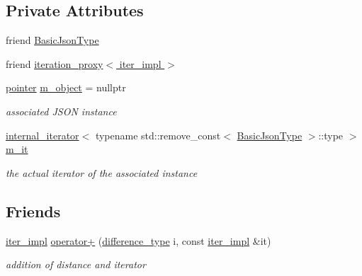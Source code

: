 \subsection*{Private Attributes}
\begin{DoxyCompactItemize}
\item 
friend \hyperlink{classnlohmann_1_1detail_1_1iter__impl_abf18f18793f84b0222aebb5a2a87da7a}{Basic\+Json\+Type}
\item 
friend \hyperlink{classnlohmann_1_1detail_1_1iter__impl_a28328d17a18d9754c89c5c8159677a6f}{iteration\+\_\+proxy$<$ iter\+\_\+impl $>$}
\item 
\hyperlink{classnlohmann_1_1detail_1_1iter__impl_a69e52f890ce8c556fd68ce109e24b360}{pointer} \hyperlink{classnlohmann_1_1detail_1_1iter__impl_aca84f84be598bdfaaddd23d928c42bbb}{m\+\_\+object} = nullptr
\begin{DoxyCompactList}\small\item\em associated J\+S\+ON instance \end{DoxyCompactList}\item 
\hyperlink{structnlohmann_1_1detail_1_1internal__iterator}{internal\+\_\+iterator}$<$ typename std\+::remove\+\_\+const$<$ \hyperlink{classnlohmann_1_1detail_1_1iter__impl_abf18f18793f84b0222aebb5a2a87da7a}{Basic\+Json\+Type} $>$\+::type $>$ \hyperlink{classnlohmann_1_1detail_1_1iter__impl_a8a86a7c0d4af0cc4ab345b6f0e13cdfa}{m\+\_\+it}
\begin{DoxyCompactList}\small\item\em the actual iterator of the associated instance \end{DoxyCompactList}\end{DoxyCompactItemize}
\subsection*{Friends}
\begin{DoxyCompactItemize}
\item 
\hyperlink{classnlohmann_1_1detail_1_1iter__impl}{iter\+\_\+impl} \hyperlink{classnlohmann_1_1detail_1_1iter__impl_a94108d1a7563e103534f23eb5c1ee175}{operator+} (\hyperlink{classnlohmann_1_1detail_1_1iter__impl_a2f7ea9f7022850809c60fc3263775840}{difference\+\_\+type} i, const \hyperlink{classnlohmann_1_1detail_1_1iter__impl}{iter\+\_\+impl} \&it)
\begin{DoxyCompactList}\small\item\em addition of distance and iterator \end{DoxyCompactList}\end{DoxyCompactItemize}


